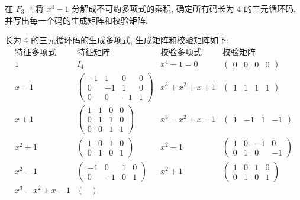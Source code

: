 \begin{exercise}
 在 $ F_{3} $ 上将 $ x^{4}-1 $ 分解成不可约多项式的乘积, 确定所有码长为 4 的三元循环码,并写出每一个码的生成矩阵和校验矩阵.

\end{exercise}
\begin{solution}
     长为 4 的三元循环码的生成多项式, 生成矩阵和校验矩阵如下:
$$
\begin{array}{|c|c|c|c|}
\hline
\text{特征多项式} & \text{特征矩阵}&\text{校验多项式} & \text{校验矩阵} \\
\hline
1 & I_4 & x^4-1=0&
\begin{pmatrix}
0 & 0 & 0 & 0
\end{pmatrix} \\
\hline
x - 1 &
\begin{pmatrix}
-1 & 1 & 0 & 0 \\
0 & -1 & 1 & 0 \\
0 & 0 & -1 & 1
\end{pmatrix} &  x^3+x^2+x+1&
\begin{pmatrix}
1 & 1 & 1 & 1
\end{pmatrix} \\
\hline
x + 1 &
\begin{pmatrix}
1 & 1 & 0 & 0 \\
0 & 1 & 1 & 0 \\
0 & 0 & 1 & 1
\end{pmatrix} &x^3-x^2+x-1&
\begin{pmatrix}
1 & -1 & 1 & -1
\end{pmatrix} \\
\hline
x^2 + 1 &
\begin{pmatrix}
1 & 0 & 1 & 0 \\
0 & 1 & 0 & 1
\end{pmatrix} &x^2-1&
\begin{pmatrix}
1 & 0 & -1 & 0 \\
0 & 1 & 0 & -1
\end{pmatrix} \\
\hline
x^2 - 1 &
\begin{pmatrix}
-1 & 0 & 1 & 0 \\
0 & -1 & 0 & 1
\end{pmatrix} &x^2+1&
\begin{pmatrix}
1 & 0 & 1 & 0 \\
0 & 1 & 0 & 1
\end{pmatrix} \\
\hline
x^3 - x^2 + x - 1 &
\begin{pmatrix}

\end{pmatrix}
\end{array}$$
\end{solution}
